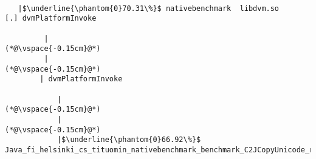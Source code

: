 
\begin{lstlisting}[caption=Unicode-merkkijonon kopiointi C$\to$Java, label=profile:C2JCopyUnicode-512, numberbychapter=true, frame=lines, float, floatplacement=t]

   |$\underline{\phantom{0}70.31\%}$ nativebenchmark  libdvm.so           [.] dvmPlatformInvoke

         |
(*@\vspace{-0.15cm}@*)
         |
(*@\vspace{-0.15cm}@*)
        | dvmPlatformInvoke

            |
(*@\vspace{-0.15cm}@*)
            |
(*@\vspace{-0.15cm}@*)
            |$\underline{\phantom{0}66.92\%}$ Java_fi_helsinki_cs_tituomin_nativebenchmark_benchmark_C2JCopyUnicode_runInternal


\end{lstlisting}
